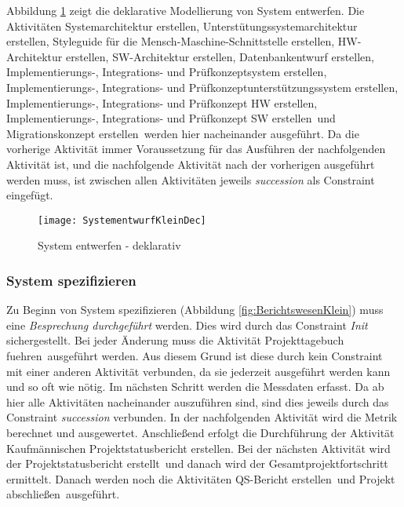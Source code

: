 {Abbildung \ref{fig:SystementwurfKleinDec} zeigt die deklarative Modellierung von System entwerfen.\newline
Die Aktivitäten \grqq Systemarchitektur erstellen, Unterstütungssystemarchitektur erstellen, Styleguide für die Mensch-Maschine-Schnittstelle erstellen, HW-Architektur erstellen, SW-Architektur erstellen, Datenbankentwurf erstellen, Implementierungs-, Integrations- und Prüfkonzeptsystem erstellen, Implementierungs-, Integrations- und Prüfkonzeptunterstützungssystem erstellen, Implementierungs-, Integrations- und Prüfkonzept HW erstellen, Implementierungs-, Integrations- und Prüfkonzept SW erstellen\grqq \ und \grqq Migrationskonzept erstellen\grqq \ werden hier nacheinander ausgeführt. Da die vorherige Aktivität immer Voraussetzung für das Ausführen der nachfolgenden Aktivität ist, und die nachfolgende Aktivität nach der vorherigen ausgeführt werden muss, ist zwischen allen Aktivitäten jeweils \textit{succession} als Constraint eingefügt.

\begin{figure}[!htbp]
\begin{center}
  \texttt{[image: SystementwurfKleinDec]} %
  \caption{System entwerfen - deklarativ}
  \label{fig:SystementwurfKleinDec}
\end{center}
\end{figure}

\subsubsection{System spezifizieren}


Zu Beginn von System spezifizieren (Abbildung \ref{fig:BerichtswesenKlein}) muss eine \textit{Besprechung durchgeführt} werden. Dies wird durch das Constraint \textit{Init} sichergestellt. Bei jeder Änderung muss die Aktivität \grqq Projekttagebuch fuehren\grqq \ ausgeführt werden. Aus diesem Grund ist diese durch kein Constraint mit einer anderen Aktivität verbunden, da sie jederzeit ausgeführt werden kann und so oft wie nötig.
Im nächsten Schritt werden die \grqq Messdaten erfasst\grqq. Da ab hier alle Aktivitäten nacheinander auszuführen sind, sind dies jeweils durch das Constraint \textit{succession} verbunden.\newline
In der nachfolgenden Aktivität wird die \grqq Metrik berechnet und ausgewertet\grqq.\newline
Anschließend erfolgt die Durchführung der Aktivität \grqq Kaufmännischen Projektstatusbericht erstellen\grqq.\newline
Bei der nächsten Aktivität wird der \grqq Projektstatusbericht erstellt\grqq \ und danach wird der \grqq Gesamtprojektfortschritt ermittelt\grqq.
Danach werden noch die Aktivitäten \grqq QS-Bericht erstellen\grqq \ und \grqq Projekt abschließen\grqq \ ausgeführt.

}
